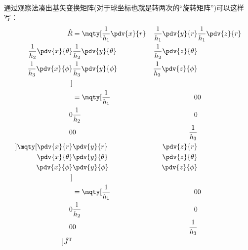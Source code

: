 通过观察法凑出基矢变换矩阵(对于球坐标也就是转两次的“旋转矩阵”)可以这样写：
\begin{equation}
    \label{eq:基矢变换矩阵}
  \begin{aligned}
    \RHat &=
  \mqty[
  \frac{1}{h_1} \pdv{x}{r} &
  \frac{1}{h_1} \pdv{y}{r} &
  \frac{1}{h_1} \pdv{z}{r} \\
  \frac{1}{h_2} \pdv{x}{\theta} &
  \frac{1}{h_2} \pdv{y}{\theta} &
  \frac{1}{h_2} \pdv{z}{\theta} \\
  \frac{1}{h_3} \pdv{x}{\phi} &
  \frac{1}{h_3} \pdv{y}{\phi} &
  \frac{1}{h_3} \pdv{z}{\phi} \\] \\
        &=
        \mqty[
  \frac{1}{h_1}  &
  0  &
  0  \\
  0  &
  \frac{1}{h_2}  &
  0  \\
  0  &
  0  &
  \frac{1}{h_3}  \\
        ]
\mqty[
  \pdv{x}{r} &
  \pdv{y}{r} &
  \pdv{z}{r} \\
  \pdv{x}{\theta} &
  \pdv{y}{\theta} &
  \pdv{z}{\theta} \\
  \pdv{x}{\phi} &
  \pdv{y}{\phi} &
  \pdv{z}{\phi} \\] \\
                & = 
        \mqty[
  \frac{1}{h_1}  &
  0  &
  0  \\
  0  &
  \frac{1}{h_2}  &
  0  \\
  0  &
  0  &
  \frac{1}{h_3}  \\
        ]
        \JJ \tp
  \end{aligned}
\end{equation}


\vspace{1cm}
